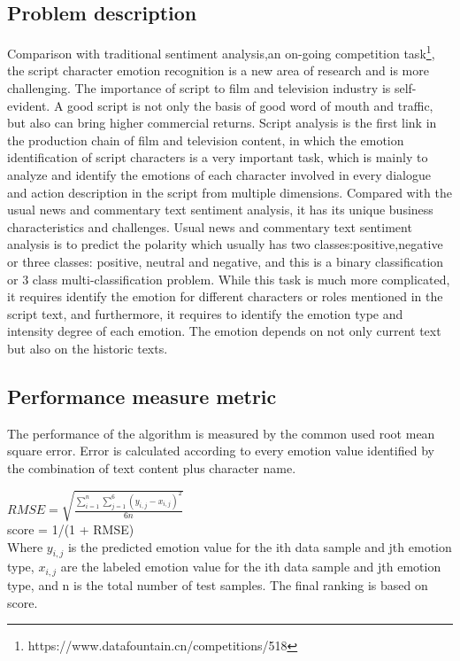 \documentclass[12pt,twocolumn,letterpaper]{article}
\begin{document}
\subsection{Problem description}
Comparison with traditional sentiment analysis,an on-going competition task\footnote{https://www.datafountain.cn/competitions/518}, the script character emotion recognition is a new area of research and is more challenging. The importance of script to film and television industry is self-evident. A good script is not only the basis of good word of mouth and traffic, but also can bring higher commercial returns. Script analysis is the first link in the production chain of film and television content, in which the emotion identification of script characters is a very important task, which is mainly to analyze and identify the emotions of each character involved in every dialogue and action description in the script from multiple dimensions. Compared with the usual news and commentary text sentiment analysis, it has its unique business characteristics and challenges. Usual news and commentary text sentiment analysis is to predict the polarity which usually has two classes:positive,negative or three classes: positive, neutral and negative, and this is a binary classification or 3 class multi-classification problem. While this task is much more complicated, it requires identify the emotion for different characters or roles mentioned in the script text, and furthermore, it requires to identify the emotion type and intensity degree of each emotion. The emotion depends on not only current text but also on the historic texts.

\subsection{Performance measure metric}
The performance of the algorithm is measured by the common used root mean square error. Error is calculated according to every emotion value identified by the combination of text content plus character name.

$R M S E=\sqrt{\frac{\sum_{i=1}^{n} \sum_{j=1}^{6}\left(y_{i, j}-x_{i, j}\right)^{2}}{6 n}}$\\

score = 1/(1 + RMSE)\\

Where $y_{i,j}$ is the predicted emotion value for the ith data sample and jth emotion type, $x_{i,j}$ are the labeled emotion value for the ith data sample and jth emotion type, and n is the total number of test samples.  
The final ranking is based on score. 
\end{document}
